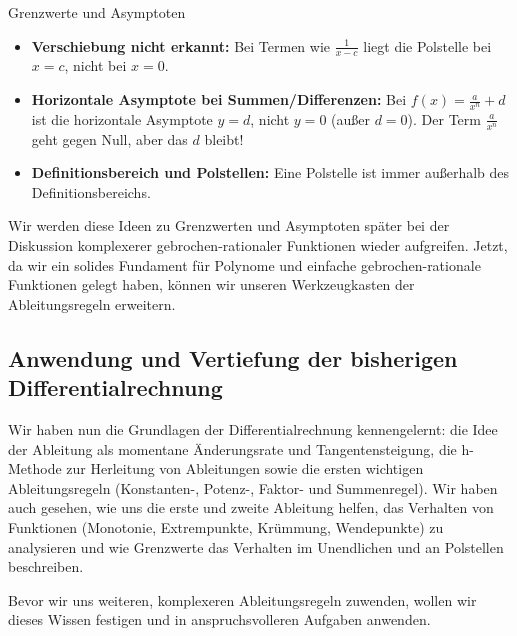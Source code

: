 \begin{fehlerboxumgebung}{Grenzwerte und Asymptoten}
\begin{itemize}
    \item \textbf{Verschiebung nicht erkannt:} Bei Termen wie $\frac{1}{x-c}$ liegt die Polstelle bei $x=c$, nicht bei $x=0$.
    \item \textbf{Horizontale Asymptote bei Summen/Differenzen:} Bei $f(x) = \frac{a}{x^n} + d$ ist die horizontale Asymptote $y=d$, nicht $y=0$ (außer $d=0$). Der Term $\frac{a}{x^n}$ geht gegen Null, aber das $d$ bleibt!
    \item \textbf{Definitionsbereich und Polstellen:} Eine Polstelle ist immer außerhalb des Definitionsbereichs.
\end{itemize}
\end{fehlerboxumgebung}

Wir werden diese Ideen zu Grenzwerten und Asymptoten später bei der Diskussion komplexerer gebrochen-rationaler Funktionen wieder aufgreifen. Jetzt, da wir ein solides Fundament für Polynome und einfache gebrochen-rationale Funktionen gelegt haben, können wir unseren Werkzeugkasten der Ableitungsregeln erweitern.
\subsection{Anwendung und Vertiefung der bisherigen Differentialrechnung}
\label{subsec:anwendung_vertiefung_diff_neu}

Wir haben nun die Grundlagen der Differentialrechnung kennengelernt: die Idee der Ableitung als momentane Änderungsrate und Tangentensteigung, die h-Methode zur Herleitung von Ableitungen sowie die ersten wichtigen Ableitungsregeln (Konstanten-, Potenz-, Faktor- und Summenregel). Wir haben auch gesehen, wie uns die erste und zweite Ableitung helfen, das Verhalten von Funktionen (Monotonie, Extrempunkte, Krümmung, Wendepunkte) zu analysieren und wie Grenzwerte das Verhalten im Unendlichen und an Polstellen beschreiben.

Bevor wir uns weiteren, komplexeren Ableitungsregeln zuwenden, wollen wir dieses Wissen festigen und in anspruchsvolleren Aufgaben anwenden.

